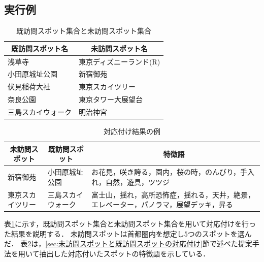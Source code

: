 \documentclass[submit]{ipsj}
\begin{document}
\subsection{実行例}
\label{subsec:実行例}
\begin{table}[t]
  \caption{既訪問スポット集合と未訪問スポット集合}
  \label{table:既訪問スポット集合と未訪問スポット集合}
  \centering
  \begin{tabular}{l|l}
  \hline  \hline
  \multicolumn{1}{c|}{既訪問スポット名} & \multicolumn{1}{c}{未訪問スポット名} \\ \hline
  浅草寺                           & 東京ディズニーランド(R)                \\
  小田原城址公園                       & 新宿御苑                         \\
  伏見稲荷大社                        & 東京スカイツリー                     \\
  奈良公園                          & 東京タワー大展望台                    \\
  三島スカイウォーク                     & 明治神宮                         \\ \hline
  \end{tabular}
\end{table}

\begin{table}[t]
  \caption{対応付け結果の例}
  \label{table:対応付け結果の例}
  \centering
  \begin{tabular}{l|l|l}
  \hline  \hline
  \multicolumn{1}{c|}{未訪問スポット} & \multicolumn{1}{c|}{既訪問スポット} & \multicolumn{1}{c}{特徴語}                     \\ \hline
  新宿御苑                      & 小田原城址公園                         & お花見，咲き誇る，園内，桜の時，のんびり，手入れ，自然，遊具，ツツジ          \\
  東京スカイツリー                     & 三島スカイウォーク                    & 富士山，揺れ，高所恐怖症，揺れる，天井，絶景，エレベーター，パノラマ，展望デッキ，昇る \\ \hline
  \end{tabular}
\end{table}

表\ref{table:既訪問スポット集合と未訪問スポット集合}に示す，既訪問スポット集合と未訪問スポット集合を用いて対応付けを行った結果を説明する．
未訪問スポットは首都圏内を想定し5つのスポットを選んだ．
表\ref{table:対応付け結果の例}は，\ref{sec:未訪問スポットと既訪問スポットの対応付け}節で述べた提案手法を用いて抽出した対応付いたスポットの特徴語を示している．
\end{document}
